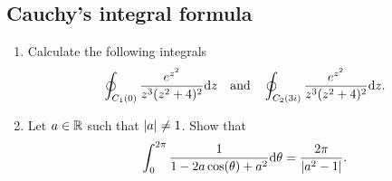 \documentclass[11pt,a4paper]{article}
\begin{document}
\subsection{Cauchy's integral formula}
\begin{exercise} \phantom{}
\begin{enumerate}
  \item[(1)] Calculate the following integrals
    \[
      \oint_{C_1(0)} \frac{e^{z^2}}{z^3 (z^2 + 4)^2} \mathrm{d} z
      \quad \text{and} \quad
      \oint_{C_2(3i)} \frac{e^{z^2}}{z^3 (z^2 + 4)^2} \mathrm{d} z.
    \]
  \item[(2)] Let $a \in \mathbb{R}$ such that $\left\lvert a\right\rvert \neq 1$.
    Show that
    \[
      \int_{0}^{2 \pi} \frac{1}{1 - 2a \cos(\theta) + a^2} \mathrm{d} \theta =
      \frac{2 \pi}{\left\lvert a^2 - 1\right\rvert}.
    \]
\end{enumerate}
\end{exercise}
\end{document}
